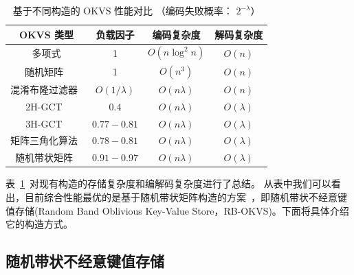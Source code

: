 \begin{table}[ht]
  \centering
  \caption{基于不同构造的 OKVS 性能对比 （编码失败概率： $2^{-\lambda}$）}
  \label{tab:okvs_comparison}
  \begin{tabular}{cccc}
    \toprule
    OKVS 类型  &  负载因子  &  编码复杂度 & 解码复杂度 \\
    \midrule
    多项式 & 1 & $O(n\log^2n)$ & $O(n)$ \\
    随机矩阵~\cite{garimella2021oblivious} & 1 & $O(n^3)$ & $O(n)$ \\
    混淆布隆过滤器~\cite{dong2013when} & $O(1/\lambda)$ & $O(n\lambda)$ & $O(n)$ \\
    2H-GCT~\cite{pinkas2020psi} & $0.4$ & $O(n\lambda)$ & $O(\lambda)$ \\
    3H-GCT~\cite{garimella2021oblivious} & $0.77-0.81$ & $O(n\lambda)$ & $O(\lambda)$ \\
    矩阵三角化算法~\cite{raghuraman2022blazing} & $0.78-0.81$ & $O(n\lambda)$ & $O(\lambda)$ \\
    随机带状矩阵~\cite{bienstock2023NearOptimal} & $0.91-0.97$ & $O(n\lambda)$ & $O(\lambda)$ \\
    \bottomrule
  \end{tabular}
\end{table}

表~\ref{tab:okvs_comparison}~对现有构造的存储复杂度和编解码复杂度进行了总结。
从表中我们可以看出，目前综合性能最优的是基于随机带状矩阵构造的方案~\cite{bienstock2023NearOptimal}，即随机带状不经意键值存储(Random Band Oblivious Key-Value Store，RB-OKVS)。下面将具体介绍它的构造方式。

\subsection{随机带状不经意键值存储}

